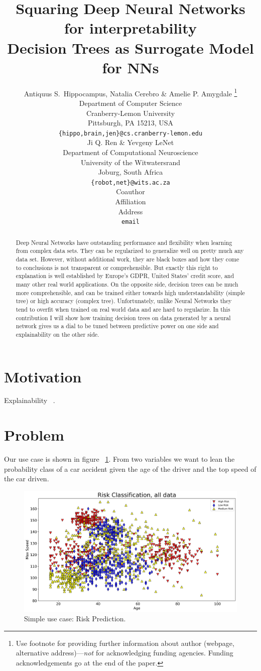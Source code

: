 \documentclass{article} %
\title{Squaring Deep Neural Networks for interpretability \\ Decision Trees as Surrogate Model for NNs}
\author{Antiquus S.~Hippocampus, Natalia Cerebro \& Amelie P. Amygdale \thanks{ Use footnote for providing further information
about author (webpage, alternative address)---\emph{not} for acknowledging
funding agencies.  Funding acknowledgements go at the end of the paper.} \\
Department of Computer Science\\
Cranberry-Lemon University\\
Pittsburgh, PA 15213, USA \\
\texttt{\{hippo,brain,jen\}@cs.cranberry-lemon.edu} \\
\And
Ji Q. Ren \& Yevgeny LeNet \\
Department of Computational Neuroscience \\
University of the Witwatersrand \\
Joburg, South Africa \\
\texttt{\{robot,net\}@wits.ac.za} \\
\AND
Coauthor \\
Affiliation \\
Address \\
\texttt{email}
}
\begin{document}
\maketitle

\begin{abstract}

Deep Neural Networks have outstanding performance and flexibility when learning from complex data sets. 
They can be regularized to generalize well on pretty much any data set. 
However, without additional work, they are black boxes and how they come to conclusions is not transparent or comprehensible. But exactly this right to explanation is well established by 
Europe's GDPR, United States' credit score, and
many other real world applications. On the opposite side, decision trees can be much more comprehensible, and can be trained either towards high understandability (simple tree) 
or high accuracy (complex tree). Unfortunately, unlike Neural Networks they tend to overfit when trained on real world data and are hard to regularize. In this contribution I will show how training decision trees on data generated by a neural network gives us a dial to be tuned between predictive power on one side and explainability on the other side.

\end{abstract}


\section{Motivation}

Explainability ~\citep{rudin2018stop}.

\section{Problem}

Our use case is shown in figure ~\ref{fig:use_case}. From two variables we want to lean the probability class of a car accident given the age of the driver and the top speed of the car driven. 

\begin{figure}[h]
\begin{center}
\includegraphics[width=\linewidth]{data.png}
\end{center}
\caption{Simple use case: Risk Prediction.}
\label{fig:use_case}
\end{figure}
\end{document}
